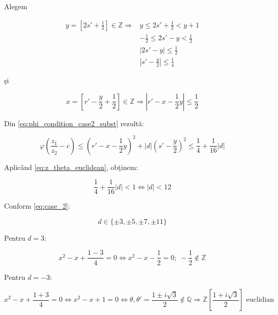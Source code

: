 \documentclass[12pt]{article}
\begin{document}
Alegem

\begin{equation}
\begin{split}
    y = \left[ 2s' + \frac{1}{2} \right] \in \mathbb{Z} \Rightarrow & 
    y \leq 2s' + \frac{1}{2} < y + 1 \\
    & -\frac{1}{2} \leq 2s'- y < \frac{1}{2} \\ 
    & \left| 2s' - y \right| \leq \frac{1}{2} \\
    & \boxed{\left| s' - \frac{y}{2} \right| \leq \frac{1}{4}}
\end{split}
\end{equation}

şi

\begin{equation}
    x = \left[ r' - \frac{y}{2} + \frac{1}{2} \right] \in \mathbb{Z} \Rightarrow 
    \boxed{|r' - x - \frac{1}{2}y| \leq \frac{1}{2}}
\end{equation}


Din \eqref{eq:phi_condition_case2_subst} rezultă:

\begin{equation}
    \varphi \left(\frac{z_1}{z_2} - c\right) \leq
    \left( r'- x - \frac{1}{2}y \right)^2 + |d|\left(s' - \frac{y}{2}\right)^2 \leq \frac{1}{4} + \frac{1}{16}|d|
\end{equation}

Aplicând \eqref{eq:z_theta_euclidean}, obţinem:

\begin{equation}
    \frac{1}{4} + \frac{1}{16}|d| < 1 \Leftrightarrow |d| < 12
\end{equation}

Conform \eqref{eq:case_2}:

\begin{equation*}
    d \in \{\pm 3, \pm 5, \pm 7, \pm 11\}
\end{equation*}

Pentru $d = 3$:

\begin{equation*}
    x^2 - x + \frac{1 - 3}{4} = 0
    \Leftrightarrow x^2 - x - \frac{1}{2} = 0; \; -\frac{1}{2} \notin \mathbb{Z}
\end{equation*}

Pentru $d = -3$:

\begin{equation}
    x^2 - x + \frac{1 + 3}{4} = 0
    \Leftrightarrow x^2 - x + 1 = 0
    \Leftrightarrow \theta, \theta' = \frac{1 \pm i\sqrt{3}}{2} \notin \mathbb{Q}
    \Rightarrow \boxed{\mathbb{Z}\left[\frac{1 + i\sqrt{3}}{2}\right] \text{ euclidian}}
\end{equation}
\end{document}
